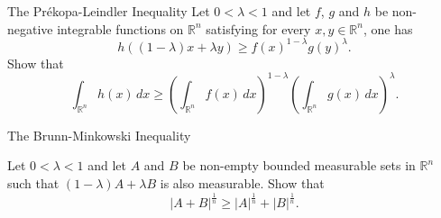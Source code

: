 \documentclass[UTF8,a4paper,10pt]{article}
\begin{document}
\begin{Problem}[]{The Prékopa-Leindler Inequality}
  Let $0 < \lambda < 1$ and let $f$, $g$ and $h$ be non-negative integrable functions on $\mathbb{R}^n$ satisfying for every $x, y \in \mathbb{R}^n$, one has
  $$
  h\left((1 - \lambda)x + \lambda y\right) \geq f(x)^{1-\lambda} g(y)^\lambda.
  $$
  Show that
  $$
  \int_{\mathbb{R}^n} h(x) \, dx \geq \left(\int_{\mathbb{R}^n} f(x) \, dx\right)^{1-\lambda} \left(\int_{\mathbb{R}^n} g(x) \, dx\right)^\lambda.
  $$
  
\end{Problem}


\pagebreak
\begin{Problem}[]{The Brunn-Minkowski Inequality}

  Let $0 < \lambda < 1$ and let $A$ and $B$ be non-empty bounded measurable sets in $\mathbb{R}^n$ such that ${(1 - \lambda)A + \lambda B}$ is also measurable. Show that
$$
|A + B|^\frac{1}{n} \geq |A|^\frac{1}{n} + |B|^\frac{1}{n}.
$$

\end{Problem}
\end{document}
